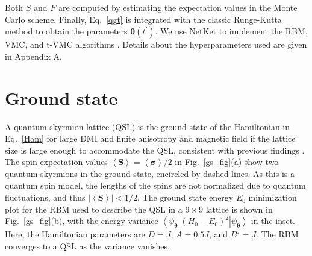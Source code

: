 \documentclass[aps,prb,twocolumn,superscriptaddress,a4paper,longbibliography]{revtex4-2}
\begin{document}
Both $S$ and $F$ are computed by estimating the expectation values in the Monte Carlo scheme. Finally, Eq.~\eqref{qgt} is integrated with the classic Runge-Kutta method to obtain the parameters $\boldsymbol{\theta}(t^\prime)$. We use NetKet to implement the RBM, VMC, and t-VMC algorithms \cite{carleo_netket_2019,vicentini_netket_2022,mpi4jax:2021}. Details about the hyperparameters used are given in Appendix A.

\section{Ground state}
\label{ground_state}

A quantum skyrmion lattice (QSL) is the ground state of the Hamiltonian in Eq.~\eqref{Ham} for large DMI and finite anisotropy and magnetic field if the lattice size is large enough to accommodate the QSL, consistent with previous findings \cite{haller_quantum_2022,joshi_ground_2023}. The spin expectation values $\left<\boldsymbol{S}\right>=\left<\boldsymbol{\sigma}\right>/2$ in Fig.~\ref{gs_fig}(a) show two quantum skyrmions in the ground state, encircled by dashed lines. As this is a quantum spin model, the lengths of the spins are not normalized due to quantum fluctuations, and thus $|\left<\boldsymbol{S}\right>|<1/2$. The ground state energy $E_0$ minimization plot for the RBM used to describe the QSL in a $9\times9$ lattice is shown in Fig.~\ref{gs_fig}(b), with the energy variance $\left<\psi_{\boldsymbol{\theta}}\right|(H_0-E_0)^2\left|\psi_{\boldsymbol{\theta}}\right>$ in the inset. Here, the Hamiltonian parameters are $D=J$, $A=0.5J$, and $B^z=J$. The RBM converges to a QSL as the variance vanishes.
\end{document}
